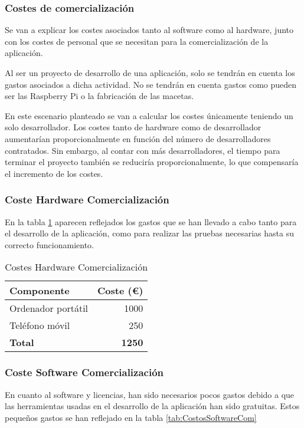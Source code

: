 \subsubsection{Costes de comercialización}

Se van a explicar los costes asociados tanto al software como al hardware, junto con los costes de personal que se necesitan para la comercialización de la aplicación.

Al ser un proyecto de desarrollo de una aplicación, solo se tendrán en cuenta los gastos asociados a dicha actividad. No se tendrán en cuenta gastos como pueden ser las Raspberry Pi o la fabricación de las macetas.

En este escenario planteado se van a calcular los costes únicamente teniendo un solo desarrollador. Los costes tanto de hardware como de desarrollador aumentarían proporcionalmente en función del número de desarrolladores contratados. Sin embargo, al contar con más desarrolladores, el tiempo para terminar el proyecto también se reduciría proporcionalmente, lo que compensaría el incremento de los costes.

\subsubsection{Coste Hardware Comercialización}
En la tabla \ref{tab:CostosHardwareComer} aparecen reflejados los gastos que se han llevado a cabo tanto para el desarrollo de la aplicación, como para realizar las pruebas necesarias hasta su correcto funcionamiento.

\begin{table}[H]
\centering
\begin{tabular}{|l|r|}
\hline
\textbf{Componente} & \textbf{Coste (€)} \\ \hline
Ordenador portátil & 1000 \\ \hline
Teléfono móvil & 250 \\ \hline
\textbf{Total} & \textbf{1250} \\ \hline
\end{tabular}
\caption{Costes Hardware Comercialización}
\label{tab:CostosHardwareComer}
\end{table}


\subsubsection{Coste Software Comercialización}
En cuanto al software y licencias, han sido necesarios pocos gastos debido a que las herramientas usadas en el desarrollo de la aplicación han sido gratuitas.
Estos pequeños gastos se han reflejado en la tabla \ref{tab:CostosSoftwareCom}

